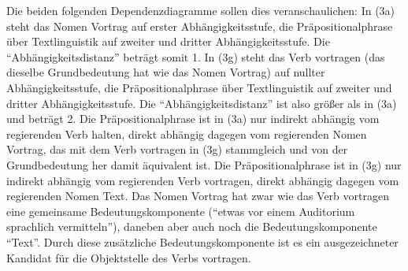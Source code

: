 \documentclass[
]{article}
\begin{document}
Die beiden folgenden Dependenzdiagramme sollen dies veranschaulichen: In (3a) steht das Nomen Vortrag auf erster Abhängigkeitsstufe, die Präpositionalphrase über Textlinguistik auf zweiter und dritter Abhängigkeitsstufe. Die ``Abhängigkeitsdistanz'' beträgt somit 1. In (3g) steht das Verb vortragen (das dieselbe Grundbedeutung hat wie das Nomen Vortrag) auf nullter Abhängigkeitsstufe, die Präpositionalphrase über Textlinguistik auf zweiter und dritter Abhängigkeitsstufe. Die ``Abhängigkeitsdistanz'' ist also größer als in (3a) und beträgt 2. Die Präpositionalphrase ist in (3a) nur indirekt abhängig vom regierenden Verb halten, direkt abhängig dagegen vom regierenden Nomen Vortrag, das mit dem Verb vortragen in (3g) stammgleich und von der Grundbedeutung her damit äquivalent ist. Die Präpositionalphrase ist in (3g) nur indirekt abhängig vom regierenden Verb vortragen, direkt abhängig dagegen vom regierenden Nomen Text. Das Nomen Vortrag hat zwar wie das Verb vortragen eine gemeinsame Bedeutungskomponente (``etwas vor einem Auditorium sprachlich vermitteln''), daneben aber auch noch die Bedeutungskomponente ``Text''. Durch diese zusätzliche Bedeutungskomponente ist es ein ausgezeichneter Kandidat für die Objektstelle des Verbs vortragen.

  
\end{document}
